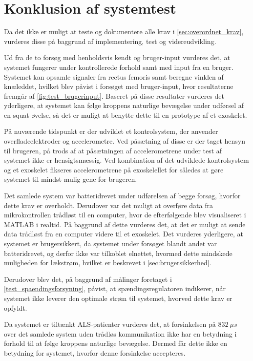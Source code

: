 \section{Konklusion af systemtest}
Da det ikke er muligt at teste og dokumentere alle krav i \autoref{sec:overordnet_krav}, vurderes disse på baggrund af implementering, test og videreudvikling. 

\noindent
Ud fra de to forsøg med henholdsvis kendt og bruger-input vurderes det, at systemet fungerer under kontrollerede forhold samt med input fra en bruger. Systemet kan opsamle signaler fra rectus femoris samt beregne vinklen af knæleddet, hvilket blev påvist i forsøget med bruger-input, hvor resultaterne fremgår af \autoref{fig:test_brugerinput}.
Baseret på disse resultater vurderes det yderligere, at systemet kan følge kroppens naturlige bevægelse under udførsel af en squat-øvelse, så det er muligt at benytte dette til en prototype af et exoskelet. 

På nuværende tidspunkt er der udviklet et kontrolsystem, der anvender overfladeelektroder og accelerometre.
Ved påsætning af disse er der taget hensyn til brugeren, på trods af at påsætningen af accelerometrene under test af systemet ikke er hensigtsmæssig. Ved kombination af det udviklede kontrolsystem og et exoskelet fikseres accelerometrene på exoskelellet for således at gøre systemet til mindst mulig gene for brugeren. 

Det samlede system var batteridrevet under udførelsen af begge forsøg, hvorfor dette krav er overholdt. Derudover var det muligt at overføre data fra mikrokontrollen trådløst til en computer, hvor de efterfølgende blev visualiseret i MATLAB i realtid. På baggrund af dette vurderes det, at det er muligt at sende data trådløst fra en computer videre til et exoskelet. Det vurderes yderligere, at systemet er brugersikkert, da systemet under forsøget blandt andet var batteridrevet, og derfor ikke var tilkoblet elnettet, hvormed dette mindskede muligheden for lækstrøm, hvilket er beskrevet i \autoref{sec:brugersikkerhed}.

Derudover blev det, på baggrund af målinger foretaget i \autoref{test_spaendingsforsyning}, påvist, at spændingsregulatoren indikerer, når systemet ikke leverer den optimale strøm til systemet, hvorved dette krav er opfyldt. 

Da systemet er tiltænkt ALS-patienter vurderes det, at forsinkelsen på $832~\mu s$ over det samlede system uden trådløs kommunikation ikke har en betydning i forhold til at følge kroppens naturlige bevægelse. Dermed får dette ikke en betydning for systemet, hvorfor denne forsinkelse accepteres. 

